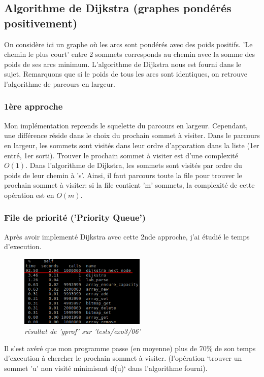 \documentclass[10pt]{article}
\begin{document}
		\subsection{Algorithme de Dijkstra (graphes pondérés positivement)}
			On considère ici un graphe où les arcs sont pondérés avec des poids positifs.\newline
			'Le chemin le plus court' entre 2 sommets corresponds au chemin avec la somme des poids de ses arcs minimum.\newline
			L'algorithme de Dijkstra nous est fourni dans le sujet. Remarquons que si le poids de tous les arcs sont identiques,
			on retrouve l'algorithme de parcours en largeur.
			\subsubsection{1ère approche}
				Mon implémentation reprends le squelette du parcours en largeur.
				Cependant, une différence réside dans le choix du prochain sommet à visiter. Dans le parcours en largeur,
				les sommets sont visités dans leur ordre d'apparation dans la liste (1er entré, 1er sorti).
				Trouver le prochain sommet à visiter est d'une complexité \textbf{\(O(1)\)}.
				Dans l'algorithme de Dijkstra, les sommets sont visités par ordre du poids de leur chemin à 's'.
				Ainsi, il faut parcours toute la file pour trouver le prochain sommet à visiter:
				si la file contient 'm' sommets, la complexité de cette opération est en \(O(m)\).

			\subsubsection{File de priorité ('Priority Queue')}
			
				Après avoir implementé Dijkstra avec cette 2nde approche, j'ai étudié le temps d'execution.
				\begin{figure}[H]
					\begin{center}
						\includegraphics[width=6cm,height=\textheight,keepaspectratio]{./images/no_pqueue.png}
					\end{center}
				    \caption{\textit{résultat de 'gprof' sur 'tests/exo3/06'}}
				\end{figure}
				Il s'est avéré que mon programme passe (en moyenne) plus de 70\% de
				son temps d'execution à chercher le prochain sommet à visiter.
				(l'opération `trouver un sommet 'u' non visité minimisant d(u)` dans l'algorithme fourni).\newline
				
\end{document}
